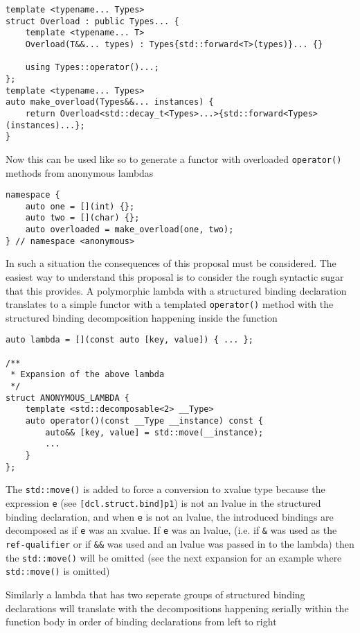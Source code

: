 \documentclass{article}
\begin{document}
\begin{lstlisting}
template <typename... Types>
struct Overload : public Types... {
    template <typename... T>
    Overload(T&&... types) : Types{std::forward<T>(types)}... {}

    using Types::operator()...;
};
template <typename... Types>
auto make_overload(Types&&... instances) {
    return Overload<std::decay_t<Types>...>{std::forward<Types>(instances)...};
}
\end{lstlisting}

Now this can be used like so to generate a functor with overloaded
\texttt{operator()} methods from anonymous lambdas

\begin{lstlisting}
namespace {
    auto one = [](int) {};
    auto two = [](char) {};
    auto overloaded = make_overload(one, two);
} // namespace <anonymous>
\end{lstlisting}

In such a situation the consequences of this proposal must be considered.  The
easiest way to understand this proposal is to consider the rough syntactic
sugar that this provides.  A polymorphic lambda with a structured binding
declaration translates to a simple functor with a templated
\texttt{operator()} method with the structured binding decomposition
happening inside the function

\begin{lstlisting}
auto lambda = [](const auto [key, value]) { ... };

/**
 * Expansion of the above lambda
 */
struct ANONYMOUS_LAMBDA {
    template <std::decomposable<2> __Type>
    auto operator()(const __Type __instance) const {
        auto&& [key, value] = std::move(__instance);
        ...
    }
};
\end{lstlisting}

The \texttt{std::move()} is added to force a conversion to xvalue type because
the expression \texttt{e} (see \texttt{[dcl.struct.bind]p1}) is not an lvalue
in the structured binding declaration, and when \texttt{e} is not an lvalue,
the introduced bindings are decomposed as if \texttt{e} was an xvalue.  If
\texttt{e} was an lvalue, (i.e.  if \texttt{\&} was used as the
\texttt{ref-qualifier} or if \texttt{\&\&} was used and an lvalue was passed in
to the lambda) then the \texttt{std::move()} will be omitted (see the next
expansion for an example where \texttt{std::move()} is omitted)

Similarly a lambda that has two seperate groups of structured binding
declarations will translate with the decompositions happening serially within
the function body in order of binding declarations from left to right
\end{document}
